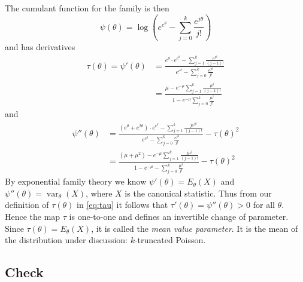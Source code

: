 \documentclass[11pt]{article}
\DeclareMathOperator{\var}{var}
\begin{document}
The cumulant function for the family is then
\begin{equation} \label{eq:psi}
    \psi(\theta)
    =
    \log \left(e^{e^\theta} - \sum_{j = 0}^k \frac{e^{j \theta}}{j !} \right)
\end{equation}
and has derivatives
\begin{equation} \label{eq:tau}
\begin{split}
    \tau(\theta)
    =
    \psi'(\theta)
    & =
    \frac{ e^\theta \cdot e^{e^\theta}
    - \sum_{j = 1}^k \frac{e^{j \theta}}{(j - 1) !} }
    {e^{e^\theta} - \sum_{j = 0}^k \frac{e^{j \theta}}{j !}}
    \\
    & =
    \frac{ \mu
    - e^{- \mu} \sum_{j = 1}^k \frac{\mu^j}{(j - 1) !} }
    {1 - e^{- \mu} \sum_{j = 0}^k \frac{\mu^j}{j !}}
\end{split}
\end{equation}
and
\begin{equation} \label{eq:psi-double-prime}
\begin{split}
    \psi''(\theta)
    & =
    \frac{ (e^\theta + e^{2 \theta}) \cdot e^{e^\theta}
    - \sum_{j = 1}^k \frac{j e^{j \theta}}{(j - 1) !} }
    {e^{e^\theta} - \sum_{j = 0}^k \frac{e^{j \theta}}{j !}}
    -
    \tau(\theta)^2
    \\
    & =
    \frac{ (\mu + \mu^2) - e^{- \mu}
    \sum_{j = 1}^k \frac{j \mu^j}{(j - 1) !} }
    {1 - e^{- \mu} - \sum_{j = 0}^k \frac{\mu^j}{j !}}
    -
    \tau(\theta)^2
\end{split}
\end{equation}
By exponential family theory we know $\psi'(\theta) = E_\theta(X)$ and
$\psi''(\theta) = \var_\theta(X)$, where $X$ is the canonical statistic.
Thus from our definition of $\tau(\theta)$
in \eqref{eq:tau} it follows that $\tau'(\theta) = \psi''(\theta) > 0$ for all $\theta$.
Hence the map $\tau$ is one-to-one and defines an invertible change of parameter.
Since $\tau(\theta) = E_\theta(X)$, it is called the \emph{mean value parameter}.
It is the mean of the distribution under discussion: $k$-truncated Poisson.

\subsection{Check}
\end{document}
